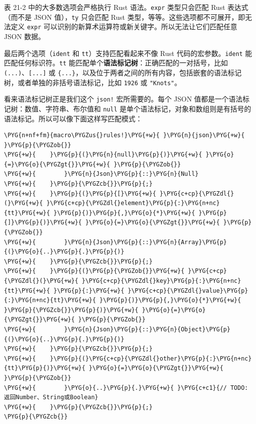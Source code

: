 表 21-2 中的大多数选项会严格执行 Rust 语法。\texttt{expr} 类型只会匹配 Rust 表达式（而不是 JSON 值），\texttt{ty} 只会匹配 Rust 类型，等等。这些选项都不可展开，即无法定义 \texttt{expr} 可以识别的新算术运算符或新关键字。所以无法让它们匹配任意 JSON 数据。

最后两个选项（\texttt{ident} 和 \texttt{tt}）支持匹配看起来不像 Rust 代码的宏参数。\texttt{ident} 能匹配任何标识符。\texttt{tt} 能匹配单个\textbf{语法标记树}：正确匹配的一对括号，比如 \texttt{(...)}、\texttt{[...]} 或 \texttt{\{...\}}，以及位于两者之间的所有内容，包括嵌套的语法标记树，或者单独的非括号语法标记，比如 \texttt{1926} 或 \texttt{"Knots"}。

看来语法标记树正是我们这个 \texttt{json!} 宏所需要的。每个 JSON 值都是一个语法标记树：数值、字符串、布尔值和 \texttt{null} 是单个语法标记，对象和数组则是有括号的语法标记。所以可以像下面这样写匹配模式：

\begin{Verbatim}[commandchars=\\\{\},breaklines=true,breakanywhere=true,fontsize=\codefont,xleftmargin=17bp]
\PYG{n+nf+fm}{macro\PYGZus{}rules!}\PYG{+w}{ }\PYG{n}{json}\PYG{+w}{ }\PYG{p}{\PYGZob{}}
\PYG{+w}{    }\PYG{p}{(}\PYG{n}{null}\PYG{p}{)}\PYG{+w}{ }\PYG{o}{=}\PYG{o}{\PYGZgt{}}\PYG{+w}{ }\PYG{p}{\PYGZob{}}
\PYG{+w}{        }\PYG{n}{Json}\PYG{p}{::}\PYG{n}{Null}
\PYG{+w}{    }\PYG{p}{\PYGZcb{}}\PYG{p}{;}
\PYG{+w}{    }\PYG{p}{(}\PYG{p}{[}\PYG{+w}{ }\PYG{c+cp}{\PYGZdl{}(}\PYG{+w}{ }\PYG{c+cp}{\PYGZdl{}element}\PYG{p}{:}\PYG{n+nc}{tt}\PYG{+w}{ }\PYG{p}{)}\PYG{p}{,}\PYG{o}{*}\PYG{+w}{ }\PYG{p}{]}\PYG{p}{)}\PYG{+w}{ }\PYG{o}{=}\PYG{o}{\PYGZgt{}}\PYG{+w}{ }\PYG{p}{\PYGZob{}}
\PYG{+w}{        }\PYG{n}{Json}\PYG{p}{::}\PYG{n}{Array}\PYG{p}{(}\PYG{o}{..}\PYG{p}{.}\PYG{p}{)}
\PYG{+w}{    }\PYG{p}{\PYGZcb{}}\PYG{p}{;}
\PYG{+w}{    }\PYG{p}{(}\PYG{p}{\PYGZob{}}\PYG{+w}{ }\PYG{c+cp}{\PYGZdl{}(}\PYG{+w}{ }\PYG{c+cp}{\PYGZdl{}key}\PYG{p}{:}\PYG{n+nc}{tt}\PYG{+w}{ }\PYG{p}{:}\PYG{+w}{ }\PYG{c+cp}{\PYGZdl{}value}\PYG{p}{:}\PYG{n+nc}{tt}\PYG{+w}{ }\PYG{p}{)}\PYG{p}{,}\PYG{o}{*}\PYG{+w}{ }\PYG{p}{\PYGZcb{}}\PYG{p}{)}\PYG{+w}{ }\PYG{o}{=}\PYG{o}{\PYGZgt{}}\PYG{+w}{ }\PYG{p}{\PYGZob{}}
\PYG{+w}{        }\PYG{n}{Json}\PYG{p}{::}\PYG{n}{Object}\PYG{p}{(}\PYG{o}{..}\PYG{p}{.}\PYG{p}{)}
\PYG{+w}{    }\PYG{p}{\PYGZcb{}}\PYG{p}{;}
\PYG{+w}{    }\PYG{p}{(}\PYG{c+cp}{\PYGZdl{}other}\PYG{p}{:}\PYG{n+nc}{tt}\PYG{p}{)}\PYG{+w}{ }\PYG{o}{=}\PYG{o}{\PYGZgt{}}\PYG{+w}{ }\PYG{p}{\PYGZob{}}
\PYG{+w}{        }\PYG{o}{..}\PYG{p}{.}\PYG{+w}{ }\PYG{c+c1}{// TODO: 返回Number、String或Boolean}
\PYG{+w}{    }\PYG{p}{\PYGZcb{}}\PYG{p}{;}
\PYG{p}{\PYGZcb{}}
\end{Verbatim}

